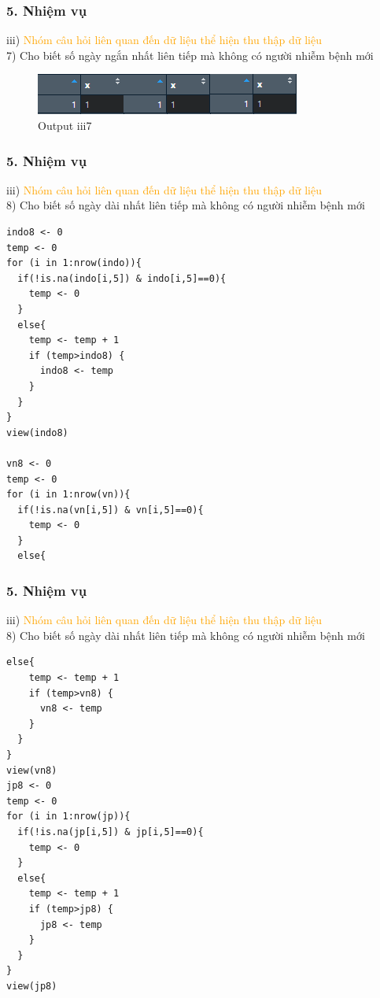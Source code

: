 \documentclass[english,10pt,table]{beamer}
\begin{document}
\begin{frame}[fragile]
\frametitle{5.  Nhiệm vụ}
	iii) \textcolor{orange}{Nhóm câu hỏi liên quan đến dữ liệu thể hiện thu thập dữ liệu}\\%
    7) Cho biết số ngày ngắn nhất liên tiếp mà không có người nhiễm bệnh mới
	\begin{figure}[h!]
	\begin{center}
		    \includegraphics[scale = 1]{Images/III/iii7.png}
		     \caption{Output iii7}
		\end{center}
		\end{figure}
\end{frame}

\begin{frame}[fragile]
\frametitle{5.  Nhiệm vụ}
	iii) \textcolor{orange}{Nhóm câu hỏi liên quan đến dữ liệu thể hiện thu thập dữ liệu}\\%
    8) Cho biết số ngày dài nhất liên tiếp mà không có người nhiễm bệnh mới   \begin{lstlisting}[frame=single]  
indo8 <- 0
temp <- 0
for (i in 1:nrow(indo)){
  if(!is.na(indo[i,5]) & indo[i,5]==0){
    temp <- 0
  }
  else{
    temp <- temp + 1
    if (temp>indo8) {
      indo8 <- temp
    }
  }
}
view(indo8)

vn8 <- 0
temp <- 0
for (i in 1:nrow(vn)){
  if(!is.na(vn[i,5]) & vn[i,5]==0){
    temp <- 0
  }
  else{
	\end{lstlisting}
\end{frame}

\begin{frame}[fragile]
\frametitle{5.  Nhiệm vụ}
	iii) \textcolor{orange}{Nhóm câu hỏi liên quan đến dữ liệu thể hiện thu thập dữ liệu}\\%
    8) Cho biết số ngày dài nhất liên tiếp mà không có người nhiễm bệnh mới   \begin{lstlisting}[frame=single]  
  else{
    temp <- temp + 1
    if (temp>vn8) {
      vn8 <- temp
    }
  }
}
view(vn8)
jp8 <- 0
temp <- 0
for (i in 1:nrow(jp)){
  if(!is.na(jp[i,5]) & jp[i,5]==0){
    temp <- 0
  }
  else{
    temp <- temp + 1
    if (temp>jp8) {
      jp8 <- temp
    }
  }
}
view(jp8)
	\end{lstlisting}
\end{frame}
\end{document}
